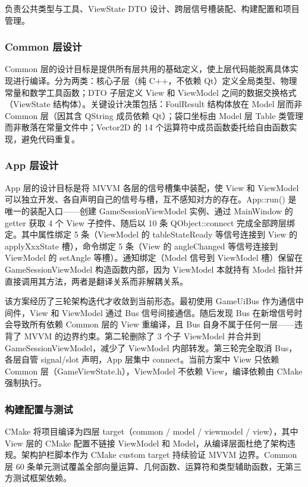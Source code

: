 \documentclass[11pt]{ctexart}
\begin{document}
负责公共类型与工具、ViewState DTO 设计、跨层信号槽装配、构建配置和项目管理。

\subsubsection{Common 层设计}

Common 层的设计目标是提供所有层共用的基础定义，使上层代码能脱离具体实现进行编译。分为两类：核心子层（纯 C++，不依赖 Qt）定义全局类型、物理常量和数学工具函数；DTO 子层定义 View 和 ViewModel 之间的数据交换格式（ViewState 结构体）。关键设计决策包括：FoulResult 结构体放在 Model 层而非 Common 层（因其含 QString 成员依赖 Qt）；袋口坐标由 Model 层 Table 类管理而非散落在常量文件中；Vector2D 的 14 个运算符中成员函数委托给自由函数实现，避免代码重复。

\subsubsection{App 层设计}

App 层的设计目标是将 MVVM 各层的信号槽集中装配，使 View 和 ViewModel 可以独立开发、各自声明自己的信号与槽，互不感知对方的存在。App::run() 是唯一的装配入口——创建 GameSessionViewModel 实例、通过 MainWindow 的 getter 获取 4 个 View 子控件、随后以 10 条 QObject::connect 完成全部跨层绑定。其中属性绑定 5 条（ViewModel 的 tableStateReady 等信号连接到 View 的 applyXxxState 槽），命令绑定 5 条（View 的 angleChanged 等信号连接到 ViewModel 的 setAngle 等槽）。通知绑定（Model 信号到 ViewModel 槽）保留在 GameSessionViewModel 构造函数内部，因为 ViewModel 本就持有 Model 指针并直接调用其方法，两者是翻译关系而非解耦关系。

该方案经历了三轮架构迭代才收敛到当前形态。最初使用 GameUiBus 作为通信中间件，View 和 ViewModel 通过 Bus 信号间接通信。随后发现 Bus 在新增信号时会导致所有依赖 Common 层的 View 重编译，且 Bus 自身不属于任何一层——违背了 MVVM 的边界约束。第二轮删除了 3 个子 ViewModel 并合并到 GameSessionViewModel，减少了 ViewModel 内部转发。第三轮完全取消 Bus，各层自管 signal/slot 声明，App 层集中 connect。当前方案中 View 只依赖 Common 层（GameViewState.h），ViewModel 不依赖 View，编译依赖由 CMake 强制执行。

\subsubsection{构建配置与测试}

CMake 将项目编译为四层 target（common / model / viewmodel / view），其中 View 层的 CMake 配置不链接 ViewModel 和 Model，从编译层面杜绝了架构违规。架构护栏脚本作为 CMake custom target 持续验证 MVVM 边界。Common 层 60 条单元测试覆盖全部向量运算、几何函数、运算符和类型辅助函数，无第三方测试框架依赖。
\end{document}
